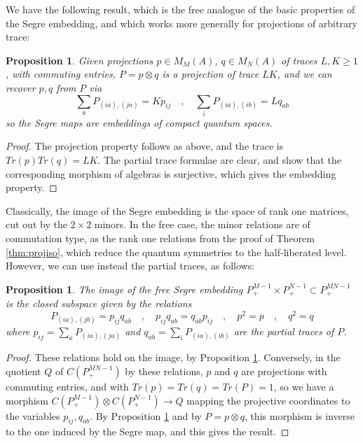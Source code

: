 \documentclass[11pt]{article}
\theoremstyle{plain}
\newtheorem{proposition}[theorem]{Proposition}
\begin{document}
\bigskip

We have the following result, which is the free analogue of the basic properties of the Segre embedding, and which works more generally for projections of arbitrary trace:

\begin{proposition}
\label{prop:segre}
Given projections $p\in M_M(A)$, $q\in M_N(A)$ of traces $L,K\geq1$, with commuting entries, $P=p\otimes q$ is a projection of trace $LK$, and we can recover $p,q$ from $P$ via
$$\sum_aP_{(ia),(ja)}=Kp_{ij}\quad,\quad
\sum_iP_{(ia),(ib)}=Lq_{ab}$$
so the Segre maps are embeddings of compact quantum spaces.
\end{proposition}

\begin{proof}
The projection property follows as above, and the trace is $Tr(p)Tr(q)=LK$. The partial trace formulae are clear, and show that the corresponding morphism of algebras is surjective, which gives the embedding property.
\end{proof}

Classically, the image of the Segre embedding is the space of rank one matrices, cut out by the $2\times2$ minors. In the free case, the minor relations are of commutation type, as the rank one relations from the proof of Theorem \ref{thm:projiso}, which reduce the quantum symmetries to the half-liberated level. However, we can use instead the partial traces, as follows:

\begin{proposition}
\label{prop:segreimage}
The image of the free Segre embedding $P^{M-1}_+\times P^{N-1}_+\subset P^{MN-1}_+$ is the closed subspace given by the relations
$$P_{(ia),(jb)}=p_{ij}q_{ab}\quad,\quad p_{ij}q_{ab}=q_{ab}p_{ij}\quad,\quad p^2=p\quad,\quad q^2=q$$
where $p_{ij}=\sum_aP_{(ia),(ja)}$ and $q_{ab}=\sum_iP_{(ia),(ib)}$ are the partial traces of $P$.
\end{proposition}

\begin{proof}
These relations hold on the image, by Proposition \ref{prop:segre}. Conversely, in the quotient $Q$ of $C(P^{MN-1}_+)$ by these relations, $p$ and $q$ are projections with commuting entries, and with $Tr(p)=Tr(q)=Tr(P)=1$, so we have a morphism $C(P^{M-1}_+)\otimes C(P^{N-1}_+)\to Q$ mapping the projective coordinates to the variables $p_{ij},q_{ab}$. By Proposition \ref{prop:segre} and by $P=p\otimes q$, this morphism is inverse to the one induced by the Segre map, and this gives the result.
\end{proof}
\end{document}
